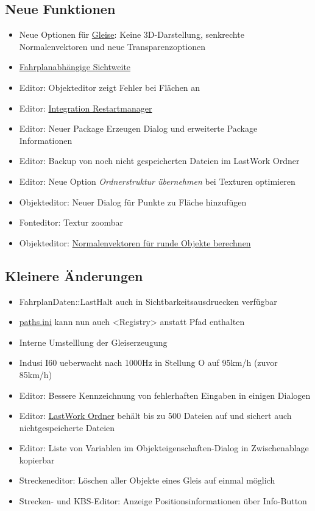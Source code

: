 \subsection{Neue Funktionen}
\begin{itemize}
\item Neue Optionen für \hyperref[sec:editor-gleise]{Gleise}: Keine 3D-Darstellung, senkrechte Normalenvektoren und neue Transparenzoptionen
\item \hyperref[sec:sim-optionen-special]{Fahrplanabhängige Sichtweite}
\item Editor: Objekteditor zeigt Fehler bei Flächen an
\item Editor: \hyperref[sec:sec:editor-lastwork]{Integration Restartmanager}
\item Editor: Neuer Package Erzeugen Dialog und erweiterte Package Informationen
\item Editor: Backup von noch nicht gespeicherten Dateien im LastWork Ordner
\item Editor: Neue Option \emph{Ordnerstruktur übernehmen} bei Texturen optimieren
\item Objekteditor: Neuer Dialog für Punkte zu Fläche hinzufügen
\item Fonteditor: Textur zoombar
\item Objekteditor: \hyperref[sec:editor-obj-l3dobj-normalen]{Normalenvektoren für runde Objekte berechnen}
\end{itemize}


\subsection{Kleinere Änderungen}
\begin{itemize}
\item FahrplanDaten::LastHalt auch in Sichtbarkeitsausdruecken verfügbar
\item \hyperref[sec:sim-optionen-paths]{paths.ini} kann nun auch <Registry> anstatt Pfad enthalten
\item Interne Umstelllung der Gleiserzeugung
\item Indusi I60 ueberwacht nach 1000Hz in Stellung O auf 95km/h (zuvor 85km/h)
\item Editor: Bessere Kennzeichnung von fehlerhaften Eingaben in einigen Dialogen
\item Editor: \hyperref[sec:sec:editor-lastwork]{LastWork Ordner} behält bis zu 500 Dateien auf und sichert auch nichtgespeicherte Dateien
\item Editor: Liste von Variablen im Objekteigenschaften-Dialog in Zwischenablage kopierbar
\item Streckeneditor: Löschen aller Objekte eines Gleis auf einmal möglich
\item Strecken- und KBS-Editor: Anzeige Positionsinformationen über Info-Button
\end{itemize}


